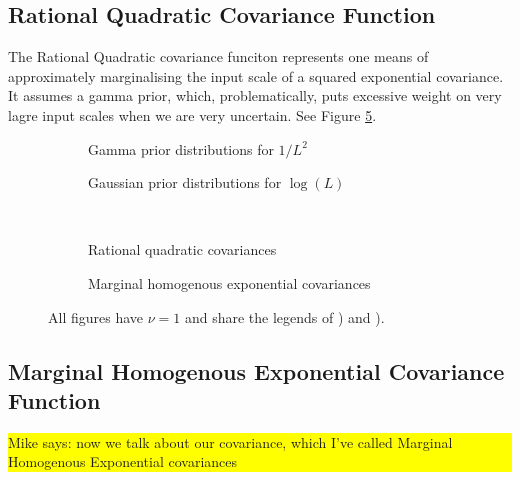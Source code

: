 \documentclass{article}
\newcommand\mikesays[1]{\colorbox{yellow}{\parbox{\columnwidth}{Mike says: #1}}}
\begin{document}
\subsection{Rational Quadratic Covariance Function} 

The Rational Quadratic covariance funciton represents one means of approximately marginalising the input scale of a squared exponential covariance. It assumes a gamma prior, which, problematically, puts excessive weight on very lagre input scales when we are very uncertain. See Figure \ref{fig:rq_vs_our_cov}.

\begin{figure}
	\begin{subfigure}[b]{7cm}
		\caption{Gamma prior distributions for $1/L^2$}
		\label{fig:gamma_prior}
	\end{subfigure}
	\begin{subfigure}[b]{7cm}
		\caption{Gaussian prior distributions for $\log(L)$}
		 \label{fig:log_normal_prior}
	\end{subfigure}
 \\[0.2cm]
	\begin{subfigure}[b]{7cm}
		\caption{Rational quadratic covariances}
		\label{fig:RQ_cov}
	\end{subfigure}
	\begin{subfigure}[b]{7cm}
		\caption{Marginal homogenous exponential covariances}
		 \label{fig:our_cov}
	\end{subfigure}
\caption{All figures have $\nu = 1$ and share the legends of ) and ).}
\label{fig:rq_vs_our_cov}
\end{figure}


\subsection{Marginal Homogenous Exponential Covariance Function} \mikesays{now we talk about our covariance, which I've called Marginal Homogenous Exponential covariances}
\end{document}
